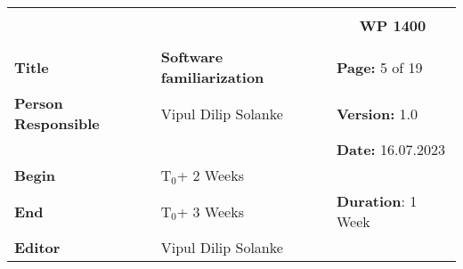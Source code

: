 \begin{table}[!h]
  \begin{center}
    \begin{tabular}{|p{35mm}||p{55mm}|p{50mm}||p{40mm}|}
      \hline
      \multicolumn{3}{|l||}{\textbf{}} & \multicolumn{1}{c|}{}                                                                                                                                                \\
      \multicolumn{3}{|l||}{\textbf{}} & \multicolumn{1}{c|}{\textbf{WP 1400}}                                                                                                                                \\
      \multicolumn{3}{|l||}{\textbf{}} & \multicolumn{1}{c|}{}                                                                                                                                                \\
      \hline\hline
      \textbf{Title}                   & \multicolumn{2}{p{7cm}||}{\textbf{Software familiarization}}
                                       & \textbf{Page:} 5 of 19                                                                                                                                              \\
      \hline
      \textbf{Person Responsible}        & \multicolumn{2}{l||}{Vipul Dilip Solanke}                                                                                                   & \textbf{Version:} 1.0   \\
      \hline
      \multicolumn{3}{|l||}{}          & \textbf{Date:} 16.07.2023                                                                                                                                          \\
      \hline\hline
      \textbf{Begin}                  & \multicolumn{2}{l||}{T$_0$+ 2 Weeks}                                                                                                                &                         \\
      \hline
      \textbf{End}                    & \multicolumn{2}{l||}{T$_0$+ 3 Weeks}                                                                                                        & \textbf{Duration}: 1 Week \\
      \hline\hline
      \textbf{Editor}              & \multicolumn{3}{l|}{Vipul Dilip Solanke}                                                                                                                              \\

\end{tabular}
\end{center}
\end{table}
